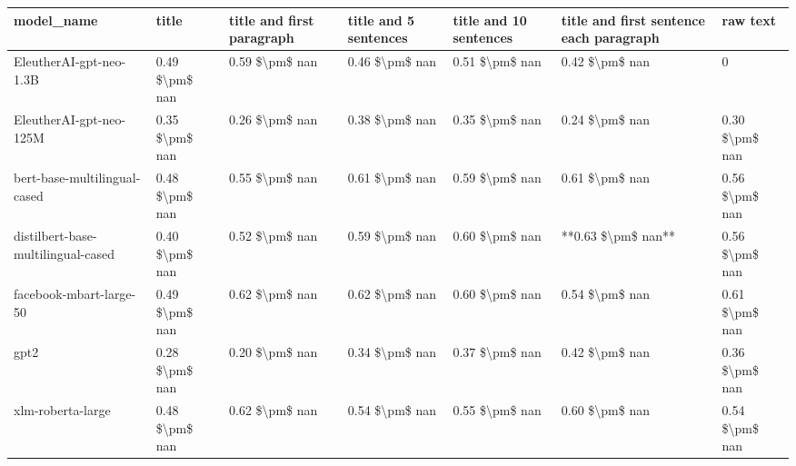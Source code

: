 \begin{tabular}{lllllll}
\toprule
                        model\_name &          title & title and first paragraph & title and 5 sentences & title and 10 sentences & title and first sentence each paragraph &       raw text \\
\midrule
           EleutherAI-gpt-neo-1.3B & 0.49 \$\textbackslash pm\$ nan &            0.59 \$\textbackslash pm\$ nan &        0.46 \$\textbackslash pm\$ nan &         0.51 \$\textbackslash pm\$ nan &                          0.42 \$\textbackslash pm\$ nan &              0 \\
           EleutherAI-gpt-neo-125M & 0.35 \$\textbackslash pm\$ nan &            0.26 \$\textbackslash pm\$ nan &        0.38 \$\textbackslash pm\$ nan &         0.35 \$\textbackslash pm\$ nan &                          0.24 \$\textbackslash pm\$ nan & 0.30 \$\textbackslash pm\$ nan \\
      bert-base-multilingual-cased & 0.48 \$\textbackslash pm\$ nan &            0.55 \$\textbackslash pm\$ nan &        0.61 \$\textbackslash pm\$ nan &         0.59 \$\textbackslash pm\$ nan &                          0.61 \$\textbackslash pm\$ nan & 0.56 \$\textbackslash pm\$ nan \\
distilbert-base-multilingual-cased & 0.40 \$\textbackslash pm\$ nan &            0.52 \$\textbackslash pm\$ nan &        0.59 \$\textbackslash pm\$ nan &         0.60 \$\textbackslash pm\$ nan &                      **0.63 \$\textbackslash pm\$ nan** & 0.56 \$\textbackslash pm\$ nan \\
           facebook-mbart-large-50 & 0.49 \$\textbackslash pm\$ nan &            0.62 \$\textbackslash pm\$ nan &        0.62 \$\textbackslash pm\$ nan &         0.60 \$\textbackslash pm\$ nan &                          0.54 \$\textbackslash pm\$ nan & 0.61 \$\textbackslash pm\$ nan \\
                              gpt2 & 0.28 \$\textbackslash pm\$ nan &            0.20 \$\textbackslash pm\$ nan &        0.34 \$\textbackslash pm\$ nan &         0.37 \$\textbackslash pm\$ nan &                          0.42 \$\textbackslash pm\$ nan & 0.36 \$\textbackslash pm\$ nan \\
                 xlm-roberta-large & 0.48 \$\textbackslash pm\$ nan &            0.62 \$\textbackslash pm\$ nan &        0.54 \$\textbackslash pm\$ nan &         0.55 \$\textbackslash pm\$ nan &                          0.60 \$\textbackslash pm\$ nan & 0.54 \$\textbackslash pm\$ nan \\
\bottomrule
\end{tabular}
